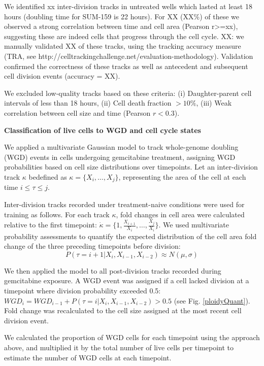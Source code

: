 \documentclass[11pt,notitlepage]{article}
\begin{document}
We identified xx inter-division tracks in untreated wells which lasted at least 18 hours (doubling time for SUM-159 is 22 hours). For XX (XX\%) of these we observed a strong correlation between time and cell area (Pearson r>=xx), suggesting these are indeed cells that progress through the cell cycle.
XX: we manually validated XX of these tracks, using the tracking accuracy measure (TRA, see http://celltrackingchallenge.net/evaluation-methodology). Validation confirmed the correctness of these tracks as well as antecedent and subsequent cell division events (accuracy = XX).\newline

We excluded low-quality tracks based on these criteria: (i) Daughter-parent cell intervals of less than 18 hours, (ii) Cell death fraction \( > 10\% \), (iii) Weak correlation between cell size and time (Pearson \( r < 0.3 \)).

\textbf{Classification of live cells to WGD and cell cycle states}

We applied a multivariate Gaussian model to track whole-genome doubling (WGD) events in cells undergoing gemcitabine treatment, assigning WGD probabilities based on cell size distributions over timepoints. Let an inter-division track $\kappa$ bedefined as \( \kappa = \{X_{i}, \dots, X_{j}\} \), representing the area of the cell at each time $i \leq \tau \leq j$.

Inter-division tracks recorded under treatment-naive conditions were used for training as follows. For each track \( \kappa \), fold changes in cell area were calculated relative to the first timepoint: $\dot{\kappa} = \{1, \frac{X_{i+1}}{X_i},\dots,\frac{ X_j}{ X_i}\}$. We used multivariate probability assessments to quantify the expected distribution of the cell area fold change of the three preceding timepoints before division:
\begin{equation}
    P(\tau = i+1 | {X_{i}, X_{i-1},X_{i-2}} ) \approx N(\mu, \sigma)
\end{equation}

We then applied the model to all post-division tracks recorded during gemcitabine exposure. A WGD event was assigned if a cell lacked division at a timepoint where division probability exceeded 0.5:
$WGD_i = WGD_{i-1} + P(\tau = i | {X_{i}, X_{i-1},X_{i-2}} )>0.5$ (see Fig. \ref{ploidyQuant}). Fold change was recalculated to the cell size assigned at the most recent cell division event.

 We calculated the proportion of WGD cells for each timepoint using the approach above, and multiplied it by the total number of live cells per timepoint to estimate the number of WGD cells at each timepoint.
\end{document}
